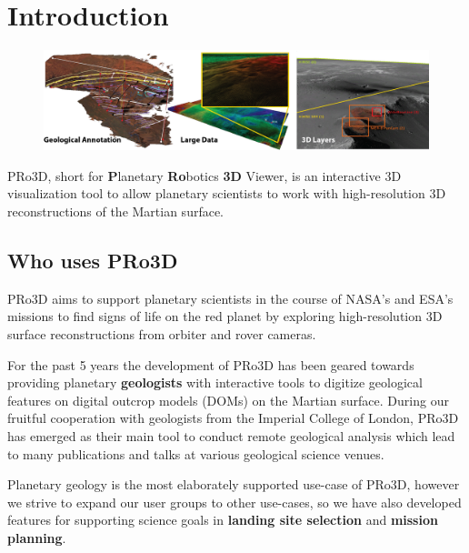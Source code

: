 \section{Introduction}

\begin{figure}[h]
    	\centering
    		\includegraphics[width=1\textwidth]{pics/Features.png}
    	\label{fig:Features}
   \end{figure}
	
PRo3D, short for \textbf{P}lanetary \textbf{Ro}botics \textbf{3D} Viewer, is an interactive 3D visualization tool to allow planetary scientists to work with high-resolution 3D reconstructions of the Martian surface.
\subsection{Who uses PRo3D}
\label{sec:whoUsesP3D}

PRo3D aims to support planetary scientists in the course of NASA's and ESA's missions to find signs of life on the red planet by exploring high-resolution 3D surface reconstructions from orbiter and rover cameras.

For the past 5 years the development of PRo3D has been geared towards providing planetary \textbf{geologists} with interactive tools to digitize geological features on digital outcrop models (DOMs) on the Martian surface. During our fruitful cooperation with geologists from the Imperial College of London, PRo3D has emerged as their main tool to conduct remote geological analysis which lead to many publications and talks at various geological science venues.

Planetary geology is the most elaborately supported use-case of PRo3D, however we strive to expand our user groups to other use-cases, so we have also developed features for supporting science goals in \textbf{landing site selection} and \textbf{mission planning}.

